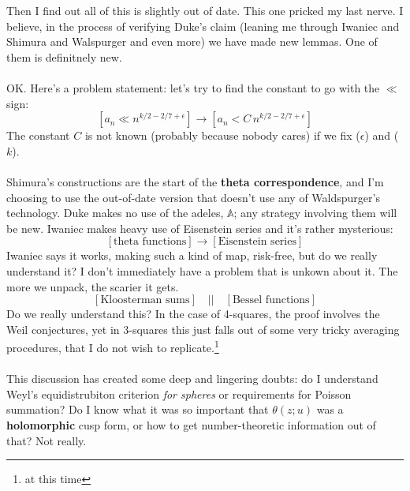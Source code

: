 \documentclass[12pt]{article}
\begin{document}
\noindent Then I find out all of this is slightly out of date.  This one pricked my last nerve.  I believe, in the process of verifying Duke's claim (leaning me through Iwaniec and Shimura and Walspurger and even more) we have made new lemmas.  One of them is definitnely new.\\ \\
OK.  Here's a problem statement: let's try to find the constant to go with the $\ll$ sign:
$$  \left[ a_n  \ll n^{k/2- 2/7 + \epsilon} \right] \to \left[ a_n  <  C \, n^{k/2- 2/7 + \epsilon}\right]$$
The constant $C$ is not known (probably because nobody cares) if we fix ($\epsilon$) and  ($k$). \\ \\
Shimura's constructions are the start of the \textbf{theta correspondence}, and I'm choosing to use the out-of-date version that doesn't use any of Waldspurger's technology.  Duke makes no use of the adeles, $\mathbb{A}$; any strategy involving them will be new.  Iwaniec makes heavy use of Eisenstein series and it's rather mysterious:
$$ [\text{theta functions}] \to [\text{Eisenstein series}] $$
Iwaniec says it works, making such a kind of map, risk-free, but do we really understand it?  I don't immediately have a problem that is unkown about it.  The more we unpack, the scarier it gets.
$$ [\text{Kloosterman sums}] \quad\big|\big|\quad [\text{Bessel functions}] $$
Do we really understand this?  In the case of 4-squares, the proof involves the Weil conjectures, yet in 3-squares this just falls out of some very tricky averaging procedures, that I do not wish to replicate.\footnote{at this time} \\ \\
This discussion has created some deep and lingering doubts: do I understand Weyl's equidistrubiton criterion \textit{for spheres} or requirements for Poisson summation?  Do I know what it was so important that $\theta(z;u)$ was a \textbf{holomorphic} cusp form, or how to get number-theoretic information out of that?  Not really.
\end{document}
